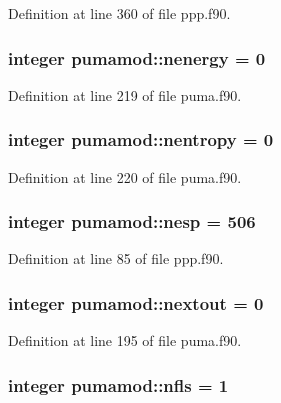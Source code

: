 \-Definition at line 360 of file ppp.\-f90.

\hypertarget{classpumamod_a0423d8412d0d82630764dd724fbe763a}{
\subsubsection[{nenergy}]{\setlength{\rightskip}{0pt plus 5cm}integer {\bf pumamod\-::nenergy} = 0}}
\label{classpumamod_a0423d8412d0d82630764dd724fbe763a}


\-Definition at line 219 of file puma.\-f90.

\hypertarget{classpumamod_a6ebc03f03149556f450c2c2c927189f2}{
\subsubsection[{nentropy}]{\setlength{\rightskip}{0pt plus 5cm}integer {\bf pumamod\-::nentropy} = 0}}
\label{classpumamod_a6ebc03f03149556f450c2c2c927189f2}


\-Definition at line 220 of file puma.\-f90.

\hypertarget{classpumamod_a16c9776cd5fc9e03115b811020c87c5a}{
\subsubsection[{nesp}]{\setlength{\rightskip}{0pt plus 5cm}integer {\bf pumamod\-::nesp} = 506}}
\label{classpumamod_a16c9776cd5fc9e03115b811020c87c5a}


\-Definition at line 85 of file ppp.\-f90.

\hypertarget{classpumamod_ac8490b47e54184cb4a1cea076d0a30a3}{
\subsubsection[{nextout}]{\setlength{\rightskip}{0pt plus 5cm}integer {\bf pumamod\-::nextout} = 0}}
\label{classpumamod_ac8490b47e54184cb4a1cea076d0a30a3}


\-Definition at line 195 of file puma.\-f90.

\hypertarget{classpumamod_a4766e3a4673c92cf9958d8241cbcbc65}{
\subsubsection[{nfls}]{\setlength{\rightskip}{0pt plus 5cm}integer {\bf pumamod\-::nfls} = 1}}
\label{classpumamod_a4766e3a4673c92cf9958d8241cbcbc65}


